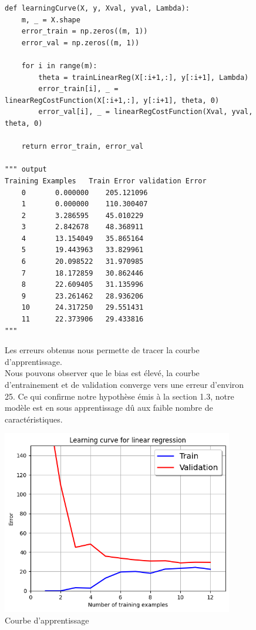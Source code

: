 \begin{figure}[!h]
\begin{verbatim}
def learningCurve(X, y, Xval, yval, Lambda):
    m, _ = X.shape
    error_train = np.zeros((m, 1))
    error_val = np.zeros((m, 1))

    for i in range(m):
        theta = trainLinearReg(X[:i+1,:], y[:i+1], Lambda)
        error_train[i], _ = linearRegCostFunction(X[:i+1,:], y[:i+1], theta, 0)
        error_val[i], _ = linearRegCostFunction(Xval, yval, theta, 0)

    return error_train, error_val

""" output
Training Examples	Train Error	validation Error
  	0		0.000000	205.121096
  	1		0.000000	110.300407
  	2		3.286595	45.010229
  	3		2.842678	48.368911
  	4		13.154049	35.865164
  	5		19.443963	33.829961
  	6		20.098522	31.970985
  	7		18.172859	30.862446
  	8		22.609405	31.135996
  	9		23.261462	28.936206
  	10		24.317250	29.551431
  	11		22.373906	29.433816
"""
\end{verbatim}   
\end{figure}


\begin{figure}[!h]
    \begin{minipage}{.48\linewidth}
       Les erreurs obtenus nous permette de tracer la courbe d'apprentissage. \\
       Nous pouvons observer que le bias est élevé, la courbe d'entrainement et de validation converge vers une erreur d'environ 25. Ce qui confirme notre hypothèse émis à la section 1.3, notre modèle est en sous apprentissage dû aux faible nombre de caractéristiques.
    \end{minipage}\hfill
    \begin{minipage}{.48\linewidth}
        \begin{center}
            \includegraphics[width=0.9\textwidth]{./img/4.1.png}
            \caption{\label{fig:bias-variance}Courbe d'apprentissage}  
        \end{center}
    \end{minipage}
\end{figure}


